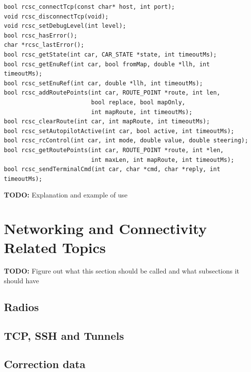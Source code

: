 \documentclass[12pt]{article} %
\newcommand{\todo}[1]{{\color{red} \textbf{TODO:} #1}}
\begin{document}
\begin{Verbatim}
bool rcsc_connectTcp(const char* host, int port);
void rcsc_disconnectTcp(void);
void rcsc_setDebugLevel(int level);
bool rcsc_hasError();
char *rcsc_lastError();
bool rcsc_getState(int car, CAR_STATE *state, int timeoutMs);
bool rcsc_getEnuRef(int car, bool fromMap, double *llh, int timeoutMs);
bool rcsc_setEnuRef(int car, double *llh, int timeoutMs);
bool rcsc_addRoutePoints(int car, ROUTE_POINT *route, int len,
                         bool replace, bool mapOnly,
                         int mapRoute, int timeoutMs);
bool rcsc_clearRoute(int car, int mapRoute, int timeoutMs);
bool rcsc_setAutopilotActive(int car, bool active, int timeoutMs);
bool rcsc_rcControl(int car, int mode, double value, double steering);
bool rcsc_getRoutePoints(int car, ROUTE_POINT *route, int *len,
                         int maxLen, int mapRoute, int timeoutMs);
bool rcsc_sendTerminalCmd(int car, char *cmd, char *reply, int timeoutMs);
\end{Verbatim} 


\todo{Explanation and example of use} 


\section{Networking and Connectivity Related Topics}

\todo{Figure out what this section should be called and what subsections it should have}

\subsection{Radios} 

\subsection{TCP, SSH and Tunnels}

\subsection{Correction data}
\end{document}
